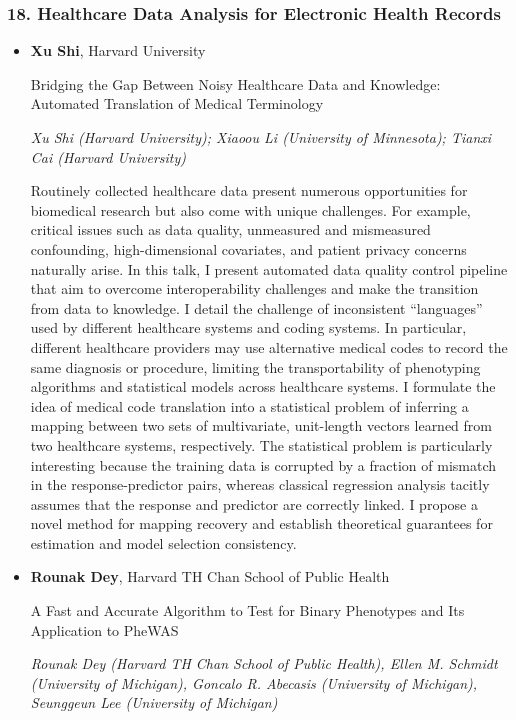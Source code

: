 \subsubsection*{18. Healthcare Data Analysis for Electronic Health Records}

\begin{itemize}
\item \textbf{Xu Shi}, Harvard University

Bridging the Gap Between Noisy Healthcare Data and Knowledge: Automated Translation of Medical Terminology

\emph{\footnotesize Xu Shi (Harvard University); Xiaoou Li (University of Minnesota); Tianxi Cai (Harvard University)}

Routinely collected healthcare data present numerous opportunities for biomedical research but also come with unique challenges. For example, critical issues such as data quality, unmeasured and mismeasured confounding, high-dimensional covariates, and patient privacy concerns naturally arise. In this talk, I present automated data quality control pipeline that aim to overcome interoperability challenges and make the transition from data to knowledge. I detail the challenge of inconsistent “languages” used by different healthcare systems and coding systems. In particular, different healthcare providers may use alternative medical codes to record the same diagnosis or procedure, limiting the transportability of phenotyping algorithms and statistical models across healthcare systems. I formulate the idea of medical code translation into a statistical problem of inferring a mapping between two sets of multivariate, unit-length vectors learned from two healthcare systems, respectively. The statistical problem is particularly interesting because the training data is corrupted by a fraction of mismatch in the response-predictor pairs, whereas classical regression analysis tacitly assumes that the response and predictor are correctly linked. I propose a novel method for mapping recovery and establish theoretical guarantees for estimation and model selection consistency.

\item \textbf{Rounak Dey}, Harvard TH Chan School of Public Health

A Fast and Accurate Algorithm to Test for Binary Phenotypes and Its Application to PheWAS

\emph{\footnotesize Rounak Dey (Harvard TH Chan School of Public Health), Ellen M. Schmidt (University of Michigan), Goncalo R. Abecasis (University of Michigan), Seunggeun Lee (University of Michigan)}


\end{itemize}
